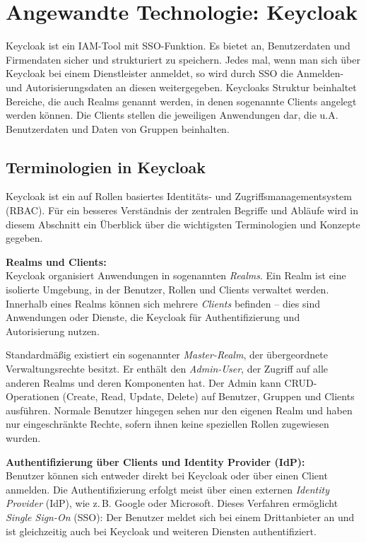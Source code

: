 \documentclass[a4paper,12pt]{article}
\begin{document}
	\section{Angewandte Technologie: Keycloak}
	Keycloak ist ein IAM-Tool mit SSO-Funktion. Es bietet an, Benutzerdaten und Firmendaten sicher und strukturiert zu speichern. Jedes mal, wenn man sich über Keycloak bei einem Dienstleister anmeldet, so wird durch SSO die Anmelden- und Autorisierungsdaten an diesen weitergegeben.
	Keycloaks Struktur beinhaltet Bereiche, die auch Realms genannt werden, in denen sogenannte Clients angelegt werden können. Die Clients stellen die jeweiligen Anwendungen dar, die u.A. Benutzerdaten und Daten von Gruppen beinhalten. 
	
	\subsection{Terminologien in Keycloak}
	Keycloak ist ein auf Rollen basiertes Identitäts- und Zugriffsmanagementsystem (RBAC). Für ein besseres Verständnis der zentralen Begriffe und Abläufe wird in diesem Abschnitt ein Überblick über die wichtigsten Terminologien und Konzepte gegeben.
	
	\vspace{0.5em}
	\textbf{Realms und Clients:}\\
	Keycloak organisiert Anwendungen in sogenannten \textit{Realms}. Ein Realm ist eine isolierte Umgebung, in der Benutzer, Rollen und Clients verwaltet werden. Innerhalb eines Realms können sich mehrere \textit{Clients} befinden – dies sind Anwendungen oder Dienste, die Keycloak für Authentifizierung und Autorisierung nutzen.
	
	Standardmäßig existiert ein sogenannter \textit{Master-Realm}, der übergeordnete Verwaltungsrechte besitzt. Er enthält den \textit{Admin-User}, der Zugriff auf alle anderen Realms und deren Komponenten hat. Der Admin kann CRUD-Operationen (Create, Read, Update, Delete) auf Benutzer, Gruppen und Clients ausführen. Normale Benutzer hingegen sehen nur den eigenen Realm und haben nur eingeschränkte Rechte, sofern ihnen keine speziellen Rollen zugewiesen wurden.
	
	\vspace{0.5em}
	\textbf{Authentifizierung über Clients und Identity Provider (IdP):}\\
	Benutzer können sich entweder direkt bei Keycloak oder über einen Client anmelden. Die Authentifizierung erfolgt meist über einen externen \textit{Identity Provider} (IdP), wie z.\,B. Google oder Microsoft. Dieses Verfahren ermöglicht \textit{Single Sign-On} (SSO): Der Benutzer meldet sich bei einem Drittanbieter an und ist gleichzeitig auch bei Keycloak und weiteren Diensten authentifiziert.
	
\end{document}
